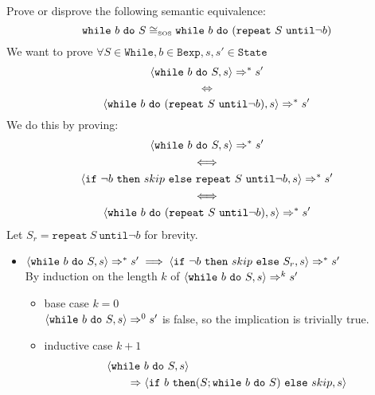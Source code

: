 \begin{exercise}{
    Prove or disprove the following semantic equivalence:
    \[ \texttt{while}\ b\ \texttt{do}\ S \cong_{\text{\tiny SOS}} \texttt{while}\ b\ \texttt{do}\ (\texttt{repeat}\ S\ \texttt{until} \neg b)  \]\vspace*{-0.6cm}
}
    We want to prove $\forall S \in \texttt{While}, b \in \texttt{Bexp}, s, s' \in \texttt{State}$
    \[ \instr{\texttt{while}\ b\ \texttt{do}\ S}{s} \Rightarrow^* s' \]\vspace*{-0.9cm}
    \[ \iff \]\vspace*{-0.7cm}
    \[ \instr{\texttt{while}\ b\ \texttt{do}\ (\texttt{repeat}\ S\ \texttt{until} \neg b)}{s} \Rightarrow^* s' \]
    We do this by proving:
    \begin{gather*}
        \instr{\texttt{while}\ b\ \texttt{do}\ S}{s} \Rightarrow^* s' \\
        \iff \\
        \instr{\texttt{if}\ \neg b\ \texttt{then}\ skip\ \texttt{else}\ \texttt{repeat}\ S\ \texttt{until} \neg b}{s} \Rightarrow^* s' \\
        \iff \\
        \instr{\texttt{while}\ b\ \texttt{do}\ (\texttt{repeat}\ S\ \texttt{until} \neg b)}{s} \Rightarrow^* s'
    \end{gather*}
    Let $S_r = \texttt{repeat}\ S\ \texttt{until} \neg b$ for brevity.
    \begin{itemize}
        \item $\instr{\texttt{while}\ b\ \texttt{do}\ S}{s} \Rightarrow^* s' \implies \instr{\texttt{if}\ \neg b\ \texttt{then}\ skip\ \texttt{else}\ S_r}{s} \Rightarrow^* s'$ \\
            By induction on the length $k$ of $\instr{\texttt{while}\ b\ \texttt{do}\ S}{s} \Rightarrow^k s'$
            \begin{itemize}
                \item base case $k=0$ \\
                $\left<\texttt{while}\ b\ \texttt{do}\ S, s\right> \Rightarrow^0 s'$ is false, so the implication is trivially true.
                \item inductive case $k+1$ \vspace*{-0.3cm}
                \begin{align*}
                    &\instr{\texttt{while}\ b\ \texttt{do}\ S}{s}
                    \\&\qquad\Rightarrow \instr{\texttt{if}\ b\ \texttt{then} (S; \texttt{while}\ b\ \texttt{do}\ S)\ \texttt{else}\ skip}{s}

\end{align*}
\end{itemize}
\end{itemize}
\end{exercise}
